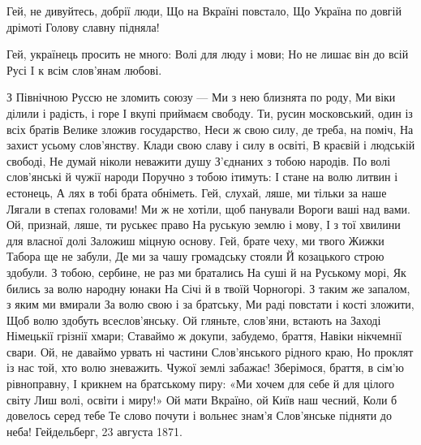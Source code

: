  
 
 


Гей, не дивуйтесь, добрії люди,
Що на Вкраїні повстало,
Що Україна по довгій дрімоті
Голову славну підняла!

Гей, українець просить не много:
Волі для люду і мови;
Но не лишає він до всій Русі
I к всім слов'янам любові.

З Північною Руссю не зломить союзу --- 
Ми з нею близнята по роду, 
Ми віки ділили і радість, і горе 
І вкупі приймаєм свободу.
Ти, русин московський, один із всіх братів
Велике зложив государство,
Неси ж свою силу, де треба, на поміч,
На захист усьому слов'янству.
Клади свою славу і силу в освіті,
В краєвій і людській свободі,
Не думай ніколи неважити душу
З'єднаних з тобою народів.
По волі слов'янські й чужії народи
Поручно з тобою ітимуть:
І стане на волю литвин і естонець,
А лях в тобі брата обніметь.
Гей, слухай, ляше, ми тільки за наше
Лягали в степах головами!
Ми ж не хотіли, щоб панували
Вороги ваші над вами.
Ой, признай, ляше, ти руськеє право
На руськую землю і мову,
І з тої хвилини для власної долі
Заложиш міцную основу.
Гей, брате чеху, ми твого Жижки
Табора ще не забули,
Де ми за чашу громадську стояли
Й козацького строю здобули.
З тобою, сербине, не раз ми братались
На суші й на Руському морі,
Як бились за волю народну юнаки
На Січі й в твоїй Чорногорі.
З таким же запалом, з яким ми вмирали
За волю свою і за братську,
Ми раді повстати і кості зложити,
Щоб волю здобуть всеслов'янську.
Ой гляньте, слов'яни, встають на Заході
Німецькії грізнії хмари;
Ставаймо ж докупи, забудемо, браття,
Навіки нікчемнії свари.
Ой, не даваймо урвать ні частини
Слов'янського рідного краю,
Но проклят із нас той, хто волю зневажить.
Чужої землі забажає!
Зберімося, браття, в сім'ю рівноправну,
І крикнем на братському пиру:
«Ми хочем для себе й для цілого світу
Лиш волі, освіти і миру!»
Ой мати Вкраїно, ой Київ наш чесний,
Коли б довелось серед тебе
Те слово почути і вольнеє знам'я
Слов'янське підняти до неба!
Гейдельберг, 23 августа 1871.
